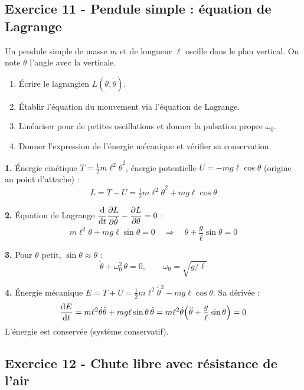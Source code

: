 \documentclass[12pt,a4paper]{article}
\begin{document}
\subsection*{Exercice 11 - Pendule simple : équation de Lagrange \niveau{\facile}}

\begin{boiteexercice}
Un pendule simple de masse $m$ et de longueur $\ell$ oscille dans le plan vertical. On note $\theta$ l'angle avec la verticale.
\begin{enumerate}
  \item Écrire le lagrangien $L(\theta,\dot\theta)$.
  \item Établir l'équation du mouvement via l'équation de Lagrange.
  \item Linéariser pour de petites oscillations et donner la pulsation propre $\omega_0$.
  \item Donner l'expression de l'énergie mécanique et vérifier sa conservation.
\end{enumerate}
\end{boiteexercice}

\begin{boitecorrige}
\textbf{1.} Énergie cinétique $T = \tfrac{1}{2}m\ell^2\dot\theta^2$, énergie potentielle $U = -mg\ell\cos\theta$ (origine au point d'attache) :
\[
L = T - U = \tfrac{1}{2}m\ell^2\dot\theta^2 + mg\ell\cos\theta
\]

\textbf{2.} Équation de Lagrange $\dfrac{\mathrm{d}}{\mathrm{d} t}\dfrac{\partial L}{\partial\dot\theta} - \dfrac{\partial L}{\partial\theta} = 0$ :
\[
m\ell^2\ddot\theta + mg\ell\sin\theta = 0 \quad\Longrightarrow\quad \ddot\theta + \frac{g}{\ell}\sin\theta = 0
\]

\textbf{3.} Pour $\theta$ petit, $\sin\theta \approx \theta$ :
\[
\ddot\theta + \omega_0^2\,\theta = 0, \qquad \omega_0 = \sqrt{g/\ell}
\]

\textbf{4.} Énergie mécanique $E = T + U = \tfrac{1}{2}m\ell^2\dot\theta^2 - mg\ell\cos\theta$. Sa dérivée :
\[
\frac{\mathrm{d} E}{\mathrm{d} t} = m\ell^2\dot\theta\ddot\theta + mg\ell\sin\theta\,\dot\theta = m\ell^2\dot\theta\!\left(\ddot\theta + \frac{g}{\ell}\sin\theta\right) = 0
\]
L'énergie est conservée (système conservatif).
\end{boitecorrige}

\subsection*{Exercice 12 - Chute libre avec résistance de l'air \niveau{\moyen}}
\end{document}
